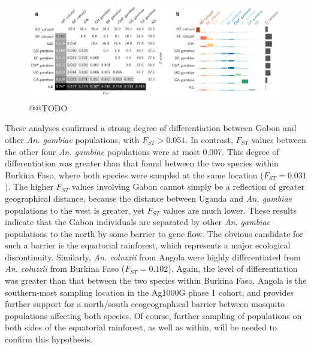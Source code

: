 \documentclass[a4paper,11pt,abstracton,hidelinks]{scrartcl}
\begin{document}
\begin{figure}[t!]
\centering
\includegraphics[width=1\textwidth]{artwork/chapter4/popdiff.pdf}
\caption{@@TODO
%
}
\label{fig:popdiff}
\end{figure}


These analyses confirmed a strong degree of differentiation between Gabon and other \textit{An. gambiae} populations, with $F_{ST} > 0.051$.
%
In contrast, $F_{ST}$ values between the other four \textit{An. gambiae} populations were at most 0.007.
%
This degree of differentiation was greater than that found between the two species within Burkina Faso, where both species were sampled at the same location ($F_{ST} = 0.031$).
%
The higher $F_{ST}$ values involving Gabon cannot simply be a reflection of greater geographical distance, because the distance between Uganda and \textit{An. gambiae} populations to the west is greater, yet $F_{ST}$ values are much lower.
%
These results indicate that the Gabon individuals are separated by other \textit{An. gambiae} populations to the north by some barrier to gene flow.
%
The obvious candidate for such a barrier is the equatorial rainforest, which represents a major ecological discontinuity.
%
Similarly, \textit{An. coluzzii} from Angola were highly differentiated from \textit{An. coluzzii} from Burkina Faso ($F_{ST} = 0.102$).
%
Again, the level of differentiation was greater than that between the two species within Burkina Faso.
%
Angola is the southern-most sampling location in the Ag1000G phase 1 cohort, and provides further support for a north/south ecogeographical barrier between mosquito populations affecting both species.
%
Of course, further sampling of populations on both sides of the equatorial rainforest, as well as within, will be needed to confirm this hypothesis.
\end{document}
